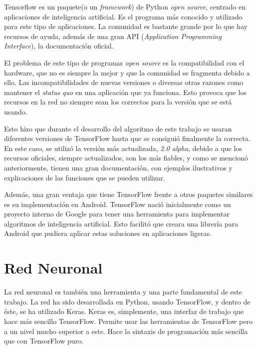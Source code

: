 \documentclass[12pt]{book}
\numberwithin{equation}{section}
\begin{document}
Tensorflow es un paquete(o un \textit{framework}) de Python \textit{open source}, centrado en aplicaciones de inteligencia artificial. Es el programa más conocido y utilizado para este tipo de aplicaciones. La comunidad es bastante grande por lo que hay recursos de ayuda, además de una gran API (\textit{Application Programming Interface}), la documentación oficial.

El problema de este tipo de programas \textit{open source} es la compatibilidad con el hardware, que no es siempre la mejor y que la comunidad se fragmenta debido a ello. Las incompatibilidades de nuevas versiones o diversas otras razones como mantener el \textit{status quo} en una aplicación que ya funciona. Esto provoca que los recursos en la red no siempre sean los correctos para la versión que se está usando.

Esto hizo que durante el desarrollo del algoritmo de este trabajo se usaran diferentes versiones de TensorFlow hasta que se consiguió finalmente la correcta. En este caso, se utilizó la versión más actualizada, \textit{2.0 alpha}, debido a que los recursos oficiales, siempre actualizados, son los más fiables, y como se mencionó anteriormente, tienen una gran documentación, con ejemplos ilustrativos y explicaciones de las funciones que se pueden utilizar.

Además, una gran ventaja que tiene TensorFlow frente a otros paquetes similares es su implementación en Android. TensorFlow nació inicialmente como un proyecto interno de Google para tener una herramienta para implementar algoritmos de inteligencia artificial. Esto facilitó que creara una librería para Android que pudiera aplicar estas soluciones en aplicaciones ligeras.


 
\section{Red Neuronal}

La red neuronal es también una herramienta y una parte fundamental de este trabajo. La red ha sido desarrollada en Python, usando TensorFlow, y dentro de éste, se ha utilizado Keras. Keras es, simplemente, una interfaz de trabajo que hace más sencillo TensorFlow. Permite usar las herramientas de TensorFlow pero a un nivel mucho superior a este. Hace la sintaxis de programación más sencilla que con TensorFlow puro.
\end{document}
